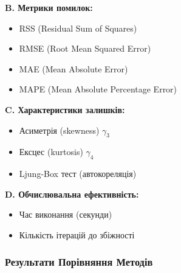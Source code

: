 \documentclass[12pt,a4paper]{article}
\begin{document}
\textbf{B. Метрики помилок:}
\begin{itemize}
    \item RSS (Residual Sum of Squares)
    \item RMSE (Root Mean Squared Error)
    \item MAE (Mean Absolute Error)
    \item MAPE (Mean Absolute Percentage Error)
\end{itemize}

\textbf{C. Характеристики залишків:}
\begin{itemize}
    \item Асиметрія (skewness) $\gamma_3$
    \item Ексцес (kurtosis) $\gamma_4$
    \item Ljung-Box тест (автокореляція)
\end{itemize}

\textbf{D. Обчислювальна ефективність:}
\begin{itemize}
    \item Час виконання (секунди)
    \item Кількість ітерацій до збіжності
\end{itemize}

\subsubsection{Результати Порівняння Методів}
\label{subsubsec:wti_results}
\end{document}
